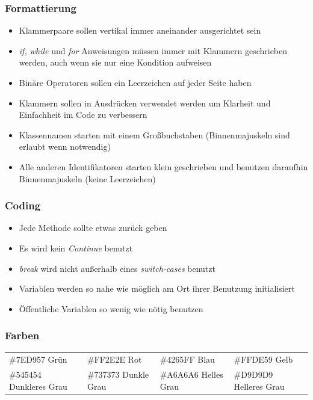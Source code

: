 \documentclass[11pt]{article}
\begin{document}
\subsubsection{Formattierung}
\begin{itemize}
\item Klammerpaare sollen vertikal immer aneinander ausgerichtet sein
\item \textit{if, while} und \textit{for} Anweisungen müssen immer mit Klammern geschrieben werden, auch wenn sie nur eine Kondition aufweisen
\item Binäre Operatoren sollen ein Leerzeichen auf jeder Seite haben
\item Klammern sollen in Ausdrücken verwendet werden um Klarheit und Einfachheit im Code zu verbessern
\item Klassennamen starten mit einem Großbuchstaben (Binnenmajuskeln sind erlaubt wenn notwendig)
\item Alle anderen Identifikatoren starten klein geschrieben und benutzen daraufhin Binnenmajuskeln (keine Leerzeichen)
\end{itemize}

\subsubsection{Coding}
\begin{itemize}
\item Jede Methode sollte etwas zurück geben
\item Es wird kein \textit{Continue} benutzt
\item \textit{break} wird nicht außerhalb eines \textit{switch-cases} benutzt
\item Variablen werden so nahe wie möglich am Ort ihrer Benutzung initialisiert
\item Öffentliche Variablen so wenig wie nötig benutzen
\end{itemize}

\subsubsection{Farben}

\begin{tabular}{llll}
\#7ED957    Grün & \#FF2E2E    Rot & \#4265FF    Blau & \#FFDE59    Gelb \\
\#545454    Dunkleres Grau & \#737373    Dunkle Grau & \#A6A6A6    Helles Grau & \#D9D9D9    Helleres Grau\\
\end{tabular}
\end{document}
